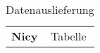 \begin{table}[h]
    \centering
    \begin{tabular}{p{4cm}|p{\textwidth - 4cm}}
    \textbf{Nicy} & Tabelle
    \end{tabular}
    \caption{Datenauslieferung}
\end{table}
